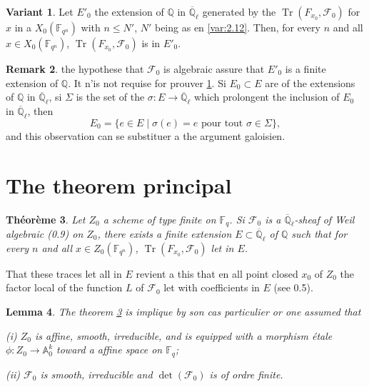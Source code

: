 \documentclass[11pt,a4paper]{article}
\theoremstyle{plain}
\newtheorem{theorem}{Th\'eor\`eme}
\newtheorem{lemma}[theorem]{Lemma}
\theoremstyle{definition}
\newtheorem{remark}[theorem]{Remark}
\newtheorem{variante}[theorem]{Variant}
\DeclareMathOperator{\tr}{Tr}
\begin{document}
\begin{variante}\label{var:2.13}
Let $E'_0$ the extension of $\mathbb{Q}$ in $\overline{\mathbb{Q}}_\ell$ generated by the $\tr(F_{x_0}, \mathcal{F}_0)$ for $x$ in a $X_0(\mathbb{F}_{q^n})$ with $n \leq N'$, $N'$ being as en \ref{var:2.12}. Then, for every $n$ and all $x \in X_0(\mathbb{F}_{q^n})$, $\tr(F_{x_0}, \mathcal{F}_0)$ is in $E'_0$.
\end{variante}

\begin{remark}\label{rem:2.14}
the hypothese that $\mathcal{F}_0$ is algebraic assure that $E'_0$ is a finite extension of $\mathbb{Q}$. It n'is not requise for prouver \ref{var:2.13}. Si $E_0 \subset E$ are of the extensions of $\mathbb{Q}$ in $\overline{\mathbb{Q}}_\ell$, si $\Sigma$ is the set of the $\sigma: E \to \overline{\mathbb{Q}}_\ell$ which prolongent the inclusion of $E_0$ in $\overline{\mathbb{Q}}_\ell$, then
\[
E_0 = \{e \in E \mid \sigma(e) = e \text{ pour tout } \sigma \in \Sigma\},
\]
and this observation can se substituer a the argument galoisien.
\end{remark}

\section{The theorem principal}

\begin{theorem}\label{thm:3.1}
Let $Z_0$ a scheme of type finite on $\mathbb{F}_q$. Si $\mathcal{F}_0$ is a $\overline{\mathbb{Q}}_\ell$-sheaf of Weil algebraic (0.9) on $Z_0$, there exists a finite extension $E \subset \overline{\mathbb{Q}}_\ell$ of $\mathbb{Q}$ such that for every $n$ and all $x \in Z_0(\mathbb{F}_{q^n})$, $\tr(F_{x_0}, \mathcal{F}_0)$ let in $E$.
\end{theorem}

That these traces let all in $E$ revient a this that en all point closed $x_0$ of $Z_0$ the factor local of the function $L$ of $\mathcal{F}_0$ let with coefficients in $E$ (see 0.5).

\begin{lemma}\label{lem:3.2}
The theorem \ref{thm:3.1} is implique by son cas particulier or one assumed that

\emph{(i)} $Z_0$ is affine, smooth, irreducible, and is equipped with a morphism étale $\phi: Z_0 \to \mathbb{A}_0^{k}$ toward a affine space on $\mathbb{F}_q$;

\emph{(ii)} $\mathcal{F}_0$ is smooth, irreducible and $\det(\mathcal{F}_0)$ is of ordre finite.
\end{lemma}
\end{document}
